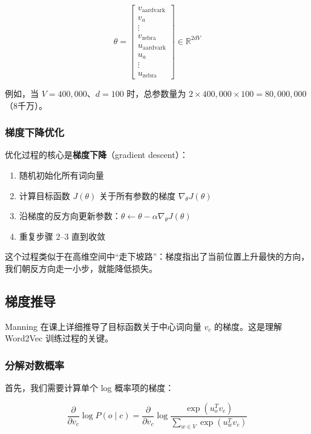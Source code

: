 \documentclass[a4paper]{article}
\begin{document}
$$\theta = \begin{bmatrix} v_{\text{aardvark}} \\ v_a \\ \vdots \\ v_{\text{zebra}} \\ u_{\text{aardvark}} \\ u_a \\ \vdots \\ u_{\text{zebra}} \end{bmatrix} \in \mathbb{R}^{2dV}$$

例如，当 $V = 400{,}000$、$d = 100$ 时，总参数量为 $2 \times 400{,}000 \times 100 = 80{,}000{,}000$（8千万）。

\subsubsection{梯度下降优化}

优化过程的核心是\textbf{梯度下降}（gradient descent）：

\begin{enumerate}
    \item 随机初始化所有词向量
    \item 计算目标函数 $J(\theta)$ 关于所有参数的梯度 $\nabla_\theta J(\theta)$
    \item 沿梯度的反方向更新参数：$\theta \leftarrow \theta - \alpha \nabla_\theta J(\theta)$
    \item 重复步骤 2--3 直到收敛
\end{enumerate}

这个过程类似于在高维空间中``走下坡路''：梯度指出了当前位置上升最快的方向，我们朝反方向走一小步，就能降低损失。

\subsection{梯度推导}

Manning 在课上详细推导了目标函数关于中心词向量 $v_c$ 的梯度。这是理解 Word2Vec 训练过程的关键。

\subsubsection{分解对数概率}

首先，我们需要计算单个 log 概率项的梯度：

$$\frac{\partial}{\partial v_c} \log P(o \mid c) = \frac{\partial}{\partial v_c} \log \frac{\exp(u_o^T v_c)}{\sum_{w \in V} \exp(u_w^T v_c)}$$
\end{document}
